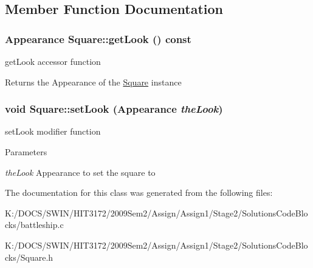 \subsection{Member Function Documentation}
\hypertarget{struct_square_ab83572f208f397010d57337b682bf689}{
\subsubsection[{getLook}]{\setlength{\rightskip}{0pt plus 5cm}Appearance Square::getLook () const}}
\label{struct_square_ab83572f208f397010d57337b682bf689}
getLook accessor function \begin{DoxyReturn}{Returns}
the Appearance of the \hyperlink{struct_square}{Square} instance 
\end{DoxyReturn}
\hypertarget{struct_square_ae8c3835149a39ecbaaf5e7feb6847546}{
\subsubsection[{setLook}]{\setlength{\rightskip}{0pt plus 5cm}void Square::setLook (Appearance {\em theLook})}}
\label{struct_square_ae8c3835149a39ecbaaf5e7feb6847546}
setLook modifier function 
\begin{DoxyParams}{Parameters}
\item[{\em theLook}]Appearance to set the square to \end{DoxyParams}


The documentation for this class was generated from the following files:\begin{DoxyCompactItemize}
\item 
K:/DOCS/SWIN/HIT3172/2009Sem2/Assign/Assign1/Stage2/SolutionsCodeBlocks/battleship.c\item 
K:/DOCS/SWIN/HIT3172/2009Sem2/Assign/Assign1/Stage2/SolutionsCodeBlocks/Square.h\end{DoxyCompactItemize}
